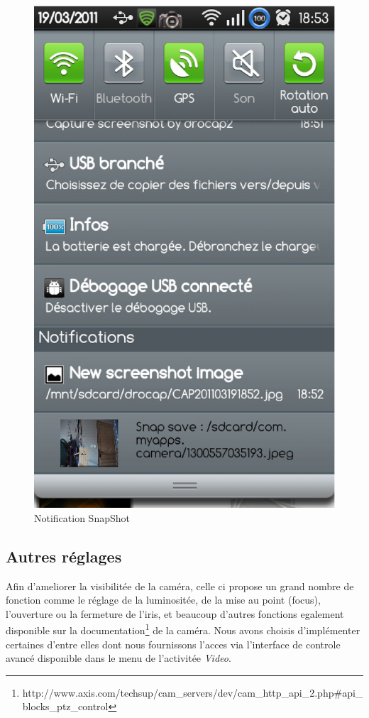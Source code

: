 \begin{figure}[H]
  \label{notification}
  \centering
   \includegraphics[scale=0.4]{Images/notification.eps}
  \caption{Notification SnapShot}
\end{figure}  

\subsection{Autres réglages}
Afin d'ameliorer la visibilitée de la caméra, celle ci propose un grand nombre
de fonction comme le réglage de la luminositée, de la mise au point
(focus), l'ouverture ou la fermeture de l'iris, et beaucoup d'autres fonctions
egalement disponible sur la
documentation\footnote{\label{MjpegView}http://www.axis.com/techsup/cam\_servers/dev/cam\_http\_api\_2.php\#api\_blocks\_ptz\_control}
de la caméra.\newline
\indent Nous avons choisis d'implémenter certaines d'entre elles dont nous
fournissons l'acces via l'interface de controle avancé disponible dans le menu
de l'activitée \textit{Video}.

